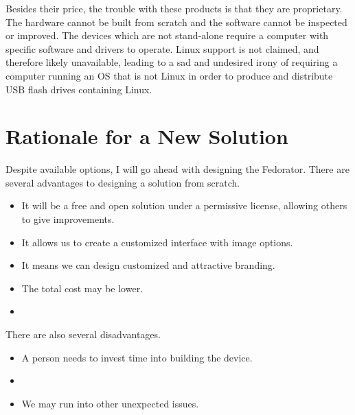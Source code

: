             Besides their price, the trouble with these products is that they are proprietary.  The hardware cannot be built from scratch and the software cannot be inspected or improved.  The devices which are not stand-alone require a computer with specific software and drivers to operate.  Linux support is not claimed, and therefore likely unavailable, leading to a sad and undesired irony of requiring a computer running an OS that is not Linux in order to produce and distribute USB flash drives containing Linux.
        \subsection{}
    \section{Rationale for a New Solution}
        Despite available options, I will go ahead with designing the Fedorator.  There are several advantages to designing a solution from scratch.
        
        \begin{itemize}
            \item It will be a free and open solution under a permissive license, allowing others to give improvements.
            \item It allows us to create a customized interface with image options.
            \item It means we can design customized and attractive branding.
            \item The total cost may be lower.
            \item {}
        \end{itemize}
        
        There are also several disadvantages. 
        \begin{itemize}
            \item A person needs to invest time into building the device.
            \item {}
            \item We may run into other unexpected issues.
        \end{itemize}
